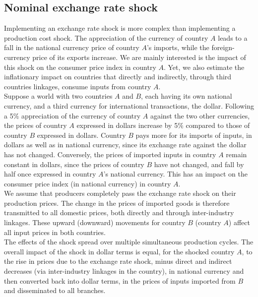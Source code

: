 \documentclass[11pt,a4paper]{article}
\begin{document}
\subsection{Nominal exchange rate shock} \label{subsec:chocchange}

Implementing an exchange rate shock is more complex than implementing a production cost shock. 
The appreciation of the currency of country $A$ leads to a fall in the national currency price of country $A$'s imports, while the foreign-currency price of its exports increase. 
We are mainly interested is the impact of this shock on the consumer price index in country $A$. 
Yet, we also estimate the inflationary impact on countries that directly and indirectly, through third countries linkages, consume inputs from country $A$.\\
Suppose a world with two countries $A$ and $B$, each having its own national currency, and a third currency for international transactions, the dollar.
Following a 5$\%$ appreciation of the currency of country $A$ against the two other currencies, the prices of country $A$ expressed in dollars increase by 5$\%$ compared to those of country $B$ expressed in dollars. 
Country $B$ pays more for its imports of inputs, in dollars as well as in national currency, since its exchange rate against the dollar has not changed. 
Conversely, the prices of imported inputs in country $A$ remain constant in dollars, since the prices of country $B$ have not changed, and fall by half once expressed in country $A$'s national currency. 
This has an impact on the consumer price index (in national currency) in country $A$.\\
We assume that producers completely pass the exchange rate shock on their production prices. 
The change in the prices of imported goods is therefore transmitted to all domestic prices, both directly and through inter-industry linkages. 
These upward (downward) movements for country $B$ (country $A$) affect all input prices in both countries.\\
The effects of the shock spread over multiple simultaneous production cycles. The overall impact of the shock in dollar terms is equal, for the shocked country $A$, to the rise in prices due to the exchange rate shock, minus direct and indirect decreases (via inter-industry linkages in the country), in national currency and then converted back into dollar terms, in the prices of inputs imported from $B$ and disseminated to all branches. 
\end{document}
